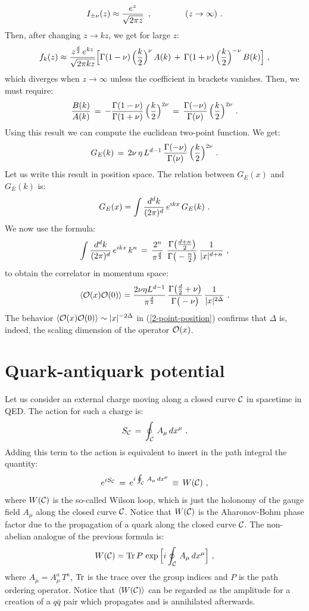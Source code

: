 \documentclass[12pt,notitlepage,a4paper]{article}
\newcommand{\beq}{\begin{equation}}
\newcommand{\eeq}{\end{equation}}
\begin{document}
\beq
I_{\pm \nu}(z)\approx {e^{z}\over \sqrt{2\pi z}}
\,\,\,,
\qquad\qquad 
(z\to\infty)\,\,.
\eeq
Then, after changing $z\to kz$, we get for large $z$:
\beq
f_k(z)\approx {z^{{d\over 2}}\,e^{kz}\over \sqrt{2\pi kz}}
\Big[
\Gamma(1- \nu)\,\Big({k\over 2}\Big)^{\nu}\,A(k)\,+\,
\Gamma(1+ \nu)\,\Big({k\over 2}\Big)^{-\nu}\,B(k)\Big]\,\,,
\eeq
which diverges when $z\to\infty$ unless the coefficient in brackets vanishes. Then, we must require:
\beq
{B(k)\over A(k)}\,=\,-{\Gamma(1-\nu)\over \Gamma(1+\nu)}\,
\Big({k\over 2}\Big)^{2\nu}\,=\,{\Gamma(-\nu)\over \Gamma(\nu)}\,
\Big({k\over 2}\Big)^{2\nu}\,\,.
\eeq
Using this result we can compute the  euclidean two-point function. We get:
\beq
G_E(k)\,=\,2\nu\,\eta \,L^{d-1}\,
{\Gamma(-\nu)\over \Gamma(\nu)}\,
\Big({k\over 2}\Big)^{2\nu}\,\,.
\eeq
Let us write this result in position space. The relation between $G_E(x)$ and $G_E(k)$ is: 
\beq
G_E(x)=\int {d^dk\over (2\pi)^d}\,e^{ikx}\,G_E(k)\,\,.
\eeq
We now use the formula:
\beq
\int {d^dk\over (2\pi)^d}\,e^{ikx}\,k^n\,=\,
{2^n\over \pi^{{d\over 2}}}\,\,
{\Gamma\big({d+n\over 2}\big)\over 
\Gamma\big(-{n\over 2}\big)}\,
{1\over |x|^{d+n}}\,\,,
\eeq
to obtain the correlator in momentum space:
\beq
\langle {\cal O}(x) {\cal O}(0)\rangle=
{2\nu \eta  L^{d-1}\over \pi^{{d\over 2}}}\,
{\Gamma\big({d\over 2}+\nu\big)\over 
\Gamma\big(-\nu\big)}\,
{1\over |x|^{2\Delta}}\,\,.
\label{2-point-position}
\eeq
The behavior $\langle {\cal O}(x) {\cal O}(0)\rangle\sim |x|^{-2\Delta}$ in (\ref{2-point-position}) confirms that $\Delta$ is, indeed,  the scaling dimension of the operator ${\cal O}(x)$. 



\section{Quark-antiquark potential}

Let us consider an external charge moving along a closed curve ${\cal C}$ in spacetime in QED. The action for such a charge is:
\beq
S_{{\cal C}}\,=\,\oint_{{\cal C}}\,A_{\mu}\,dx^{\mu}\,\,.
\eeq
Adding this term to the action is equivalent to insert in the path integral the quantity:
\beq
e^{iS_{{\cal C}}}\,=\,e^{i\oint_{{\cal C}}\,A_{\mu}\,dx^{\mu}}\,
\equiv \,W({\cal C})\,\,,
\eeq
where $W({\cal C})$ is the so-called Wilson loop, which is just the holonomy of the gauge field $A_{\mu}$ along the closed curve ${\cal C}$. Notice that $W({\cal C})$ is the Aharonov-Bohm phase factor due to the propagation of a quark along the closed curve ${\cal C}$. The non-abelian analogue of the previous formula is:
\beq
W({\cal C})={\rm Tr}\,P\,\exp\Big[i\oint_{{\cal C}}\,A_{\mu}\,dx^{\mu}\Big]\,\,,
\eeq
where $A_{\mu}=A_{\mu}^a\,T^a$, ${\rm Tr}$ is the trace over the group indices and $P$ is the path ordering operator. Notice that $\langle W({\cal C}) \rangle$ can be regarded as the amplitude for a creation of a $q\bar q$ pair which propagates and is annihilated afterwards. 
\end{document}
